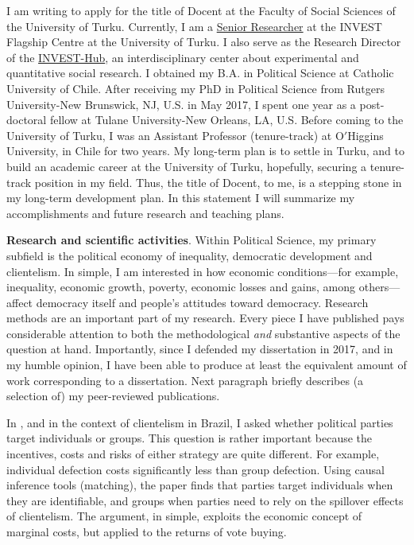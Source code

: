 \documentclass[10pt,stdletter,dateno,sigleft]{newlfm} %
\begin{document}
\begin{newlfm}

\vspace{-0.3cm}I am writing to apply for the title of Docent at the Faculty of Social Sciences of the University of Turku. Currently, I am a \href{https://www.utu.fi/en/people/hector-bahamonde-norambuena}{Senior Researcher} at the INVEST Flagship Centre at the University of Turku. I also serve as the Research Director of the \href{https://www.utu.fi/en/investhub}{INVEST-Hub}, an interdisciplinary center about experimental and quantitative social research. I obtained my B.A. in Political Science at Catholic University of Chile. After receiving my PhD in Political Science from Rutgers University-New Brunswick, NJ, U.S. in May 2017, I spent one year as a post-doctoral fellow at Tulane University-New Orleans, LA, U.S. Before coming to the University of Turku, I was an Assistant Professor (tenure-track) at O$'$Higgins University, in Chile for two years. My long-term plan is to settle in Turku, and to build an academic career at the University of Turku, hopefully, securing a tenure-track position in my field. Thus, the title of Docent, to me, is a stepping stone in my long-term development plan. In this statement I will summarize my accomplishments and future research and teaching plans.

{\bf Research and scientific activities}. Within Political Science, my primary subfield is the political economy of inequality, democratic development and clientelism. In simple, I am interested in how economic conditions---for example, inequality, economic growth, poverty, economic losses and gains, among others---affect democracy itself and people's attitudes toward democracy. Research methods are an important part of my research. Every piece I have published pays considerable attention to both the methodological \emph{and} substantive aspects of the question at hand. Importantly, since I defended my dissertation in 2017, and in my humble opinion, I have been able to produce at least the equivalent amount of work corresponding to a dissertation. Next paragraph briefly describes (a selection of) my peer-reviewed publications.


In \href{https://doi.org/10.1177/1866802X1801000202}{\textcite{Bahamonde2018}}, and in the context of clientelism in Brazil, I asked whether political parties target individuals or groups. This question is rather important because the incentives, costs and risks of either strategy are quite different. For example, individual defection costs significantly less than group defection. Using causal inference tools (matching), the paper finds that parties target individuals when they are identifiable, and groups when parties need to rely on the spillover effects of clientelism. The argument, in simple, exploits the economic concept of marginal costs, but applied to the returns of vote buying. 


\end{newlfm}
\end{document}
